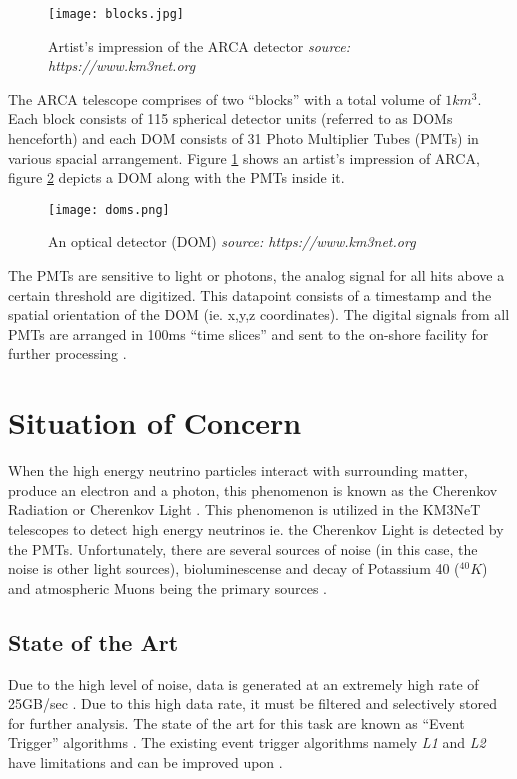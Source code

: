 \begin{figure}[h]
  \centering
  \texttt{[image: blocks.jpg]}
  \caption{Artist's impression of the ARCA detector \textit{source: https://www.km3net.org}}%
  \label{fig:blocks}
\end{figure}

The ARCA telescope comprises of two ``blocks'' with a total volume of
$1km^{3}$. Each block consists of 115 spherical detector units (referred to as
DOMs henceforth) and each DOM consists of 31 Photo Multiplier Tubes (PMTs) in
various spacial arrangement. Figure \ref{fig:blocks} shows an artist's
impression of ARCA, figure \ref{fig:doms} depicts a DOM along with the PMTs
inside it.

\begin{figure}[h]
  \centering
  \texttt{[image: doms.png]}
  \caption{An optical detector (DOM) \textit{source: https://www.km3net.org}}%
  \label{fig:doms}
\end{figure}

The PMTs are sensitive to light or photons, the analog signal for all hits
above a certain threshold are digitized. This datapoint consists of a timestamp
and the spatial orientation of the DOM (ie. x,y,z coordinates). The digital
signals from all PMTs are arranged in 100ms ``time slices'' and sent to the
on-shore facility for further processing \cite{aiello2019km3net}.

\section{Situation of Concern}

When the high energy neutrino particles interact with surrounding matter,
produce an electron and a photon, this phenomenon is known as the Cherenkov
Radiation or Cherenkov Light \cite{margiotta2014km3net}. This phenomenon is
utilized in the KM3NeT telescopes to detect high energy neutrinos ie. the
Cherenkov Light is detected by the PMTs. Unfortunately, there are several
sources of noise (in this case, the noise is other light sources),
bioluminescense and decay of Potassium 40 ($^{40}K$) and atmospheric Muons being
the primary sources \cite{post2019km3nnet}.

\subsection{State of the Art}\label{state-of-the-art}

Due to the high level of noise, data is generated at an extremely high rate of
25GB/sec \cite{adrian2016letter}. Due to this high data rate, it must be
filtered and selectively stored for further analysis. The state of the art for
this task are known as ``Event Trigger'' algorithms
\cite{adrian2016letter,aiello2019km3net}. The existing event trigger algorithms
namely \emph{L1} and \emph{L2} have limitations and can be improved upon
\cite{karas2019data}.

